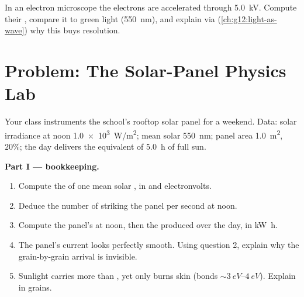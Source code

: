 \begin{exercise}[$\star\star\star$]\label{exo:g12:quantum-world:15}
In an electron microscope the electrons are accelerated through \qty{5.0}{kV}.
Compute their , compare it to green light (\qty{550}{nm}),
and explain via  (\cref{ch:g12:light-as-wave}) why this buys resolution.
\end{exercise}

\section{Problem: The Solar-Panel Physics Lab}

\begin{problem}
\label{pb:g12:quantum-world:1}
Your class instruments the school's rooftop solar panel for a weekend.
Data: solar irradiance at noon \qty{1.0e3}{W/m^2}; mean solar 
\qty{550}{nm}; panel area \qty{1.0}{m^2},  $20\%$; the day
delivers the equivalent of \qty{5.0}{h} of full sun.

\medskip
\noindent\textbf{Part I ---  bookkeeping.}
\begin{enumerate}
  \item Compute the  of one mean solar , in  and electronvolts.
  \item Deduce the number of  striking the panel per second at noon.
  \item Compute the panel's  at noon, then the 
        produced over the day, in \unit{kW.h}.
  \item The panel's current looks perfectly smooth. Using question 2,
        explain why the grain-by-grain arrival is invisible.
  \item Sunlight carries more   than , yet only
         burns skin (bonds $\sim \qtyrange{3}{4}{eV}$). Explain in grains.
\end{enumerate}


\end{problem}
